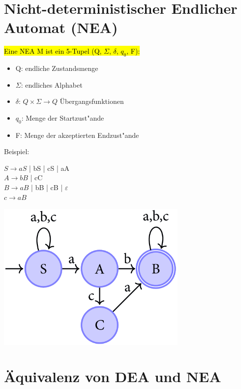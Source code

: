 \documentclass[11pt, a4paper]{scrartcl}
\begin{document}
\section{Nicht-deterministischer Endlicher Automat (NEA)}

\hl{Eine NEA M ist ein 5-Tupel (Q, $\Sigma$, $\delta$, $q_0$, F):}

\begin{itemize}
    \item Q: endliche Zustandsmenge
    \item $\Sigma$: endliches Alphabet
    \item $\delta$: $Q \times \Sigma \rightarrow Q$ Übergangsfunktionen
    \item $q_0$: Menge der Startzust"ande
    \item F: Menge der akzeptierten Endzust"ande
\end{itemize}

\vspace{2em}
Beispiel:
\vspace{1em}

\begin{minipage}[h]{0.45\textwidth}
    $S \rightarrow aS$ | bS | cS | aA \\
    $A \rightarrow bB$ | cC \\
    $B \rightarrow aB$ | bB | cB | $\varepsilon$ \\
    $c \rightarrow aB$
\end{minipage}
\begin{minipage}[h]{0.45\textwidth}
    \includegraphics[width=0.7\textwidth]{NEA-00.png}
\end{minipage}

\newpage

\section{Äquivalenz von DEA und NEA}
\end{document}
